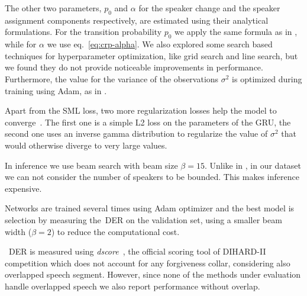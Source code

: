 \documentclass{article}
\begin{document}
The other two parameters, $p_0$ and $\alpha$ for the speaker change and the speaker assignment components respectively, are estimated using their analytical formulations. For the transition probability $p_0$ we apply the same formula as in \cite{zhang2019fully}, while for $\alpha$ we use eq.~\ref{eq:crp-alpha}. We also explored some search based techniques for hyperparameter optimization, like grid search and line search, but we found they do not provide noticeable improvements in performance. Furthermore, the value for the variance of the observations $\sigma^2$ is optimized during training using Adam, as in \cite{zhang2019fully}. 

Apart from the SML loss, two more regularization losses help the model to converge~\cite{uisrnn-official-library}. The first one is a simple L2 loss on the parameters of the GRU, the second one uses an inverse gamma distribution to regularize the value of $\sigma^2$ that would otherwise diverge to very large values.

In inference we use beam search with beam size $\beta=15$. Unlike in \cite{zhang2019fully}, in our dataset we can not consider the number of speakers to be bounded. This makes inference expensive.

Networks are trained several times using Adam optimizer and the best model is selection by measuring the~\ac{DER} on the validation set, using a smaller beam width ($\beta=2$) to reduce the computational cost. 

~\ac{DER} is measured using \textit{dscore}~\cite{dscore}, the official scoring tool of DIHARD-II competition which does not account for any forgiveness collar, considering also overlapped speech segment. However, since none of the methods under evaluation handle overlapped speech we also report performance without overlap. 
\end{document}
